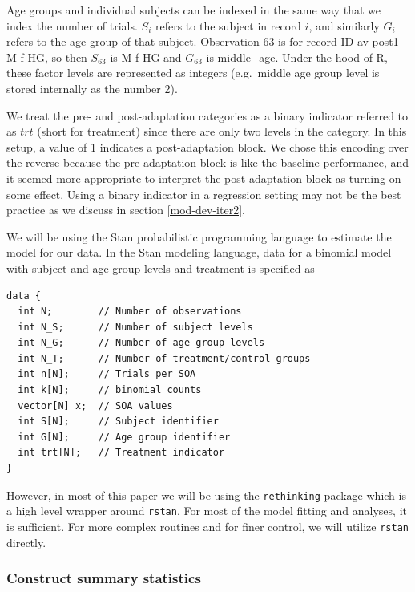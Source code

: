 \documentclass[11pt, oneside, openany]{scrbook}
\begin{document}
Age groups and individual subjects can be indexed in the same way that we index the number of trials. \(S_i\) refers to the subject in record \(i\), and similarly \(G_i\) refers to the age group of that subject. Observation 63 is for record ID av-post1-M-f-HG, so then \(S_{63}\) is M-f-HG and \(G_{63}\) is middle\_age. Under the hood of R, these factor levels are represented as integers (e.g.~middle age group level is stored internally as the number 2).

We treat the pre- and post-adaptation categories as a binary indicator referred to as \(trt\) (short for treatment) since there are only two levels in the category. In this setup, a value of 1 indicates a post-adaptation block. We chose this encoding over the reverse because the pre-adaptation block is like the baseline performance, and it seemed more appropriate to interpret the post-adaptation block as turning on some effect. Using a binary indicator in a regression setting may not be the best practice as we discuss in section \ref{mod-dev-iter2}.

We will be using the Stan probabilistic programming language to estimate the model for our data. In the Stan modeling language, data for a binomial model with subject and age group levels and treatment is specified as


\begin{verbatim}
data {
  int N;        // Number of observations
  int N_S;      // Number of subject levels
  int N_G;      // Number of age group levels
  int N_T;      // Number of treatment/control groups
  int n[N];     // Trials per SOA
  int k[N];     // binomial counts
  vector[N] x;  // SOA values
  int S[N];     // Subject identifier
  int G[N];     // Age group identifier
  int trt[N];   // Treatment indicator
}
\end{verbatim}


However, in most of this paper we will be using the \texttt{rethinking} package \citep{R-rethinking} which is a high level wrapper around \texttt{rstan}. For most of the model fitting and analyses, it is sufficient. For more complex routines and for finer control, we will utilize \texttt{rstan} directly.

\hypertarget{construct-summary-statistics}{%
\subsubsection{Construct summary statistics}\label{construct-summary-statistics}}
\end{document}
